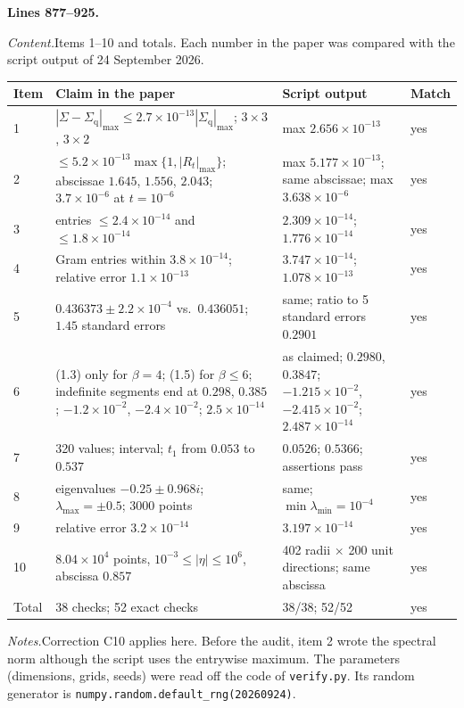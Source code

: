 \documentclass[11pt]{amsart}
\newcommand{\src}[1]{\par\bigskip\noindent\textbf{Lines #1.}\enspace}
\newcommand{\content}{\par\smallskip\noindent\textit{Content.}\enspace}
\newcommand{\notes}{\par\smallskip\noindent\textit{Notes.}\enspace}
\newcommand{\file}[1]{\texttt{#1}}
\begin{document}
\src{877--925}
\content Items 1--10 and totals. Each number in the paper was compared with the script output of 24 September 2026.

\medskip
{\small
\begin{longtable}{L{26pt}L{136pt}L{118pt}L{32pt}}
\toprule
Item & Claim in the paper & Script output & Match\\
\midrule
{} & $|\Sigma-\Sigma_{\mathrm q}|_{\max}\le2.7\times10^{-13}|\Sigma_{\mathrm q}|_{\max}$; $3\times3$, $3\times2$ &
max $2.656\times10^{-13}$ & yes\\
2 & $\le5.2\times10^{-13}\max\{1,|R_t|_{\max}\}$; abscissae $1.645$, $1.556$, $2.043$; $3.7\times10^{-6}$ at
$t=10^{-6}$ & max $5.177\times10^{-13}$; same abscissae; max $3.638\times10^{-6}$ & yes\\
3 & entries $\le2.4\times10^{-14}$ and $\le1.8\times10^{-14}$ & $2.309\times10^{-14}$; $1.776\times10^{-14}$ & yes\\
4 & Gram entries within $3.8\times10^{-14}$; relative error $1.1\times10^{-13}$ & $3.747\times10^{-14}$;
$1.078\times10^{-13}$ & yes\\
5 & $0.436373\pm2.2\times10^{-4}$ vs.\ $0.436051$; $1.45$ standard errors & same; ratio to 5 standard errors $0.2901$ &
yes\\
6 & (1.3) only for $\beta=4$; (1.5) for $\beta\le6$; indefinite segments end at $0.298$, $0.385$; $-1.2\times10^{-2}$,
$-2.4\times10^{-2}$; $2.5\times10^{-14}$ & as claimed; $0.2980$, $0.3847$; $-1.215\times10^{-2}$,
$-2.415\times10^{-2}$; $2.487\times10^{-14}$ & yes\\
7 & 320 values; interval; $t_1$ from $0.053$ to $0.537$ & $0.0526$; $0.5366$; assertions pass & yes\\
8 & eigenvalues $-0.25\pm0.968i$; $\lambda_{\max}=\pm0.5$; 3000 points & same; $\min\lambda_{\min}=10^{-4}$ & yes\\
9 & relative error $3.2\times10^{-14}$ & $3.197\times10^{-14}$ & yes\\
10 & $8.04\times10^4$ points, $10^{-3}\le|\eta|\le10^6$, abscissa $0.857$ & 402 radii $\times$ 200 unit
directions; same abscissa & yes\\
Total & 38 checks; 52 exact checks & 38/38; 52/52 & yes\\
\bottomrule
\end{longtable}
}
\notes Correction C10 applies here. Before the audit, item 2 wrote the spectral norm although the script uses the
entrywise maximum. The parameters (dimensions, grids, seeds) were read off the code of \file{verify.py}. Its random
generator is \texttt{numpy.random.default\_rng(20260924)}.
\end{document}
